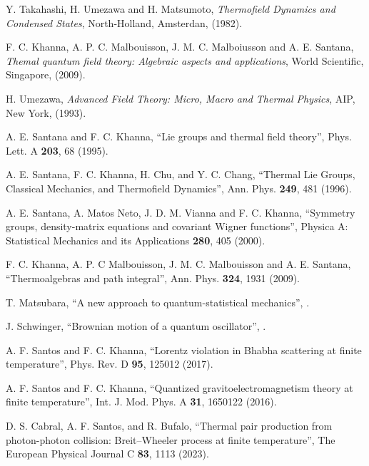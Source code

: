 \documentclass[11pt,showpacs,preprintnumbers,amsmath,amssymb,prd,nofootinbib,superscriptaddress]{revtex4-2}
\begin{document}
\begin{thebibliography}{100}
Y. Takahashi, H. Umezawa and H. Matsumoto, {\it Thermofield Dynamics and Condensed States}, North-Holland, Amsterdan, (1982).

 F. C. Khanna, A. P. C. Malbouisson, J. M. C. Malboiusson and A. E. Santana, {\it Themal quantum field theory: Algebraic aspects and applications}, World Scientific, Singapore, (2009).

 H. Umezawa, {\it Advanced Field Theory: Micro, Macro and Thermal Physics}, AIP, New York, (1993).

 A. E. Santana and F. C. Khanna, ``Lie groups and thermal field theory'',
 {Phys. Lett. A {\bf 203}, 68 (1995).}

 A. E. Santana, F. C. Khanna, H. Chu, and Y. C. Chang, ``Thermal Lie Groups, Classical Mechanics, and Thermofield Dynamics'',
 {Ann. Phys. {\bf 249}, 481 (1996).}

A. E. Santana, A. Matos Neto, J. D. M. Vianna and F. C. Khanna, ``Symmetry groups, density-matrix equations and covariant Wigner functions'', 
 {Physica A: Statistical Mechanics and its Applications {\bf 280}, 405 (2000).}


F. C. Khanna, A. P. C Malbouisson, J. M. C. Malbouisson and A. E. Santana, ``Thermoalgebras and path integral'',
 {Ann. Phys. {\bf 324}, 1931 (2009).}

 T. Matsubara, ``A new approach to quantum-statistical mechanics'', .

 J. Schwinger, ``Brownian motion of a quantum oscillator'', .

 A. F. Santos and F. C. Khanna, ``Lorentz violation in Bhabha scattering at finite temperature'',  {Phys. Rev. D {\bf 95}, 125012 (2017).}

 A. F. Santos and F. C. Khanna, ``Quantized gravitoelectromagnetism theory at finite temperature'',  {Int. J. Mod. Phys. A {\bf 31}, 1650122 (2016).}

 D. S. Cabral, A. F. Santos, and R. Bufalo, ``Thermal pair production from photon-photon collision: Breit--Wheeler process at finite temperature'',  {The European Physical Journal C {\bf 83}, 1113 (2023).}


\end{thebibliography}
\end{document}
